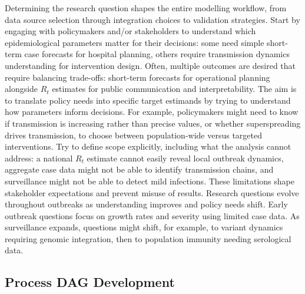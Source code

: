 \documentclass{article}
\begin{document}
Determining the research question shapes the entire modelling workflow, from data source selection through integration choices to validation strategies.
Start by engaging with policymakers and/or stakeholders to understand which epidemiological parameters matter for their decisions: some need simple short-term case forecasts for hospital planning, others require transmission dynamics understanding for intervention design.
Often, multiple outcomes are desired that require balancing trade-offs: short-term forecasts for operational planning alongside $R_t$ estimates for public communication and interpretability.
The aim is to translate policy needs into specific target estimands by trying to understand how parameters inform decisions.
For example, policymakers might need to know if transmission is increasing rather than precise values, or whether superspreading drives transmission, to choose between population-wide versus targeted interventions.
Try to define scope explicitly, including what the analysis cannot address: a national $R_t$ estimate cannot easily reveal local outbreak dynamics, aggregate case data might not be able to identify transmission chains, and surveillance might not be able to detect mild infections.
These limitations shape stakeholder expectations and prevent misuse of results.
Research questions evolve throughout outbreaks as understanding improves and policy needs shift.
Early outbreak questions focus on growth rates and severity using limited case data.
As surveillance expands, questions might shift, for example, to variant dynamics requiring genomic integration, then to population immunity needing serological data.

\subsection{Process DAG Development}
\end{document}
